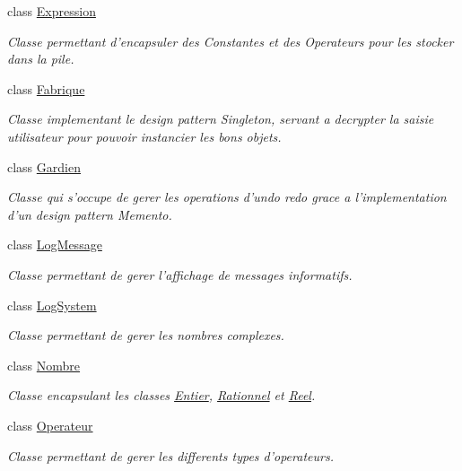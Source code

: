 \begin{DoxyCompactItemize}
class \hyperlink{class_l_o21_1_1_expression}{\-Expression}
\begin{DoxyCompactList}\small\item\em \-Classe permettant d'encapsuler des \-Constantes et des \-Operateurs pour les stocker dans la pile. \end{DoxyCompactList}\item 
class \hyperlink{class_l_o21_1_1_fabrique}{\-Fabrique}
\begin{DoxyCompactList}\small\item\em \-Classe implementant le design pattern \-Singleton, servant a decrypter la saisie utilisateur pour pouvoir instancier les bons objets. \end{DoxyCompactList}\item 
class \hyperlink{class_l_o21_1_1_gardien}{\-Gardien}
\begin{DoxyCompactList}\small\item\em \-Classe qui s'occupe de gerer les operations d'undo redo grace a l'implementation d'un design pattern \-Memento. \end{DoxyCompactList}\item 
class \hyperlink{class_l_o21_1_1_log_message}{\-Log\-Message}
\begin{DoxyCompactList}\small\item\em \-Classe permettant de gerer l'affichage de messages informatifs. \end{DoxyCompactList}\item 
class \hyperlink{class_l_o21_1_1_log_system}{\-Log\-System}
\begin{DoxyCompactList}\small\item\em \-Classe permettant de gerer les nombres complexes. \end{DoxyCompactList}\item 
class \hyperlink{class_l_o21_1_1_nombre}{\-Nombre}
\begin{DoxyCompactList}\small\item\em \-Classe encapsulant les classes \hyperlink{class_l_o21_1_1_entier}{\-Entier}, \hyperlink{class_l_o21_1_1_rationnel}{\-Rationnel} et \hyperlink{class_l_o21_1_1_reel}{\-Reel}. \end{DoxyCompactList}\item 
class \hyperlink{class_l_o21_1_1_operateur}{\-Operateur}
\begin{DoxyCompactList}\small\item\em \-Classe permettant de gerer les differents types d'operateurs. \end{DoxyCompactList}\item 

\end{DoxyCompactItemize}
